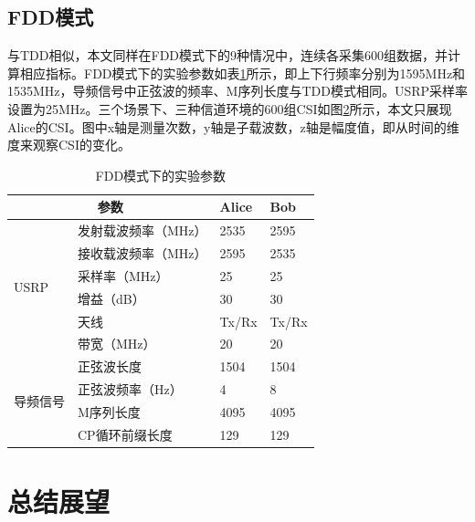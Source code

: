 \documentclass[master]{seuthesis} %
\begin{document}
\begin{Main}
\section{FDD模式}

与TDD相似，本文同样在FDD模式下的9种情况中，连续各采集600组数据，并计算相应指标。FDD模式下的实验参数如表\ref{fdd-exp-args}所示，即上下行频率分别为1595MHz和1535MHz，导频信号中正弦波的频率、M序列长度与TDD模式相同。USRP采样率设置为25MHz。三个场景下、三种信道环境的600组CSI如图\ref{}所示，本文只展现Alice的CSI。图中x轴是测量次数，y轴是子载波数，z轴是幅度值，即从时间的维度来观察CSI的变化。


\begin{table}[]
    \begin{tabular}{llll}
    \hline
    \multicolumn{2}{c}{参数} & Alice & Bob \\ \hline
    \multicolumn{1}{|l|}{\multirow{6}{*}{USRP}} & \multicolumn{1}{l|}{发射载波频率（MHz）} & \multicolumn{1}{l|}{2535} & \multicolumn{1}{l|}{2595} \\ \cline{2-4} 
    \multicolumn{1}{|l|}{} & \multicolumn{1}{l|}{接收载波频率（MHz）} & \multicolumn{1}{l|}{2595} & \multicolumn{1}{l|}{2535} \\ \cline{2-4} 
    \multicolumn{1}{|l|}{} & \multicolumn{1}{l|}{采样率（MHz）} & \multicolumn{1}{l|}{25} & \multicolumn{1}{l|}{25} \\ \cline{2-4} 
    \multicolumn{1}{|l|}{} & \multicolumn{1}{l|}{增益（dB）} & \multicolumn{1}{l|}{30} & \multicolumn{1}{l|}{30} \\ \cline{2-4} 
    \multicolumn{1}{|l|}{} & \multicolumn{1}{l|}{天线} & \multicolumn{1}{l|}{Tx/Rx} & \multicolumn{1}{l|}{Tx/Rx} \\ \cline{2-4} 
    \multicolumn{1}{|l|}{} & \multicolumn{1}{l|}{带宽（MHz）} & \multicolumn{1}{l|}{20} & \multicolumn{1}{l|}{20} \\ \hline
    \multicolumn{1}{|l|}{\multirow{4}{*}{导频信号}} & \multicolumn{1}{l|}{正弦波长度} & \multicolumn{1}{l|}{1504} & \multicolumn{1}{l|}{1504} \\ \cline{2-4} 
    \multicolumn{1}{|l|}{} & \multicolumn{1}{l|}{正弦波频率（Hz）} & \multicolumn{1}{l|}{4} & \multicolumn{1}{l|}{8} \\ \cline{2-4} 
    \multicolumn{1}{|l|}{} & \multicolumn{1}{l|}{M序列长度} & \multicolumn{1}{l|}{4095} & \multicolumn{1}{l|}{4095} \\ \cline{2-4} 
    \multicolumn{1}{|l|}{} & CP循环前缀长度 & 129 & 129 \\ \hline
    \end{tabular}
    \caption{FDD模式下的实验参数
    \label{fdd-exp-args}}
\end{table}

\chapter{总结展望}

\end{Main} %
\end{document}
